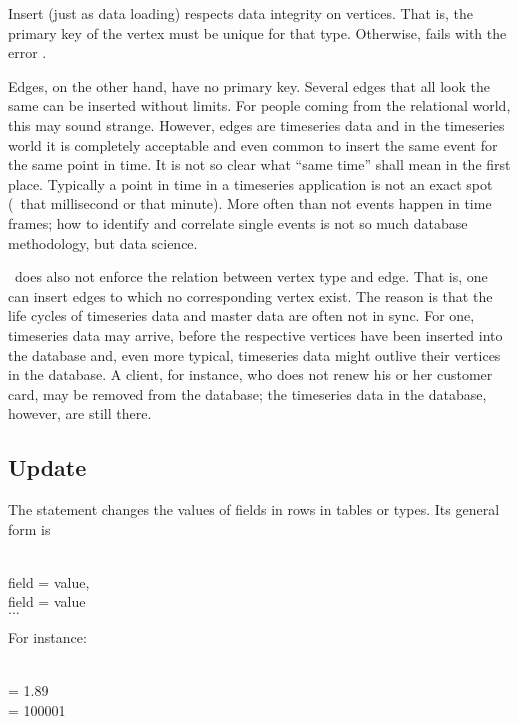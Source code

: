 Insert (just as data loading) respects data integrity
on vertices. That is, the primary key of the vertex
must be unique for that type. Otherwise, 
fails with the error .

Edges, on the other hand, have no primary key.
Several edges that all look the same can be inserted
without limits. For people coming from the relational
world, this may sound strange. However, edges are
timeseries data and in the timeseries world
it is completely acceptable and
even common to insert the same event for the same
point in time. It is not so clear 
what ``same time'' shall mean in the first place.
Typically a point in time in a timeseries application
is not an exact spot (\eg\ that millisecond or that
minute). More often than not events happen in
time frames; how to identify and correlate single events
is not so much database methodology, but data science.

\nowdb\ does also not enforce the relation between
vertex type and edge. That is, one can insert edges
to which no corresponding vertex exist.
The reason is that the life cycles of timeseries data
and master data are often not in sync.
For one, timeseries data may arrive, before the
respective vertices have been inserted into the database
and, even more typical, timeseries data might
outlive their vertices in the database.
A client, for instance, who does not renew his or her
customer card, may be removed from the database;
the timeseries data in the database, however,
are still there.

\subsection{Update}
The  statement changes the values
of fields in rows in tables or types.
Its general form is

  \\
\hspace*{0.7cm}  field = value,\\
\hspace*{0.7cm}  field = value \\
\hspace*{0.1cm}  $\dots$

For instance:

  \\
\hspace*{0.7cm}   = 1.89 \\
\hspace*{0.1cm}    = 100001

